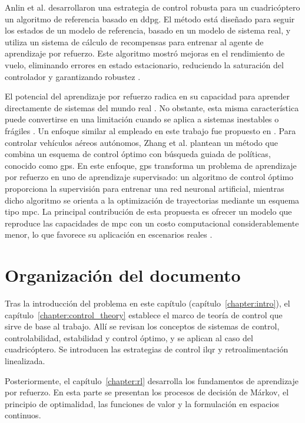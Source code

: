 Anlin et al. \cite{liu2022robust} desarrollaron una estrategia de control robusta para un cuadricóptero un algoritmo de referencia basado en \acrfull{ddpg}.  El método está diseñado para seguir los estados de un modelo de referencia, basado en un modelo de sistema real, y utiliza un sistema de cálculo de recompensas para entrenar al agente de aprendizaje por refuerzo. Este algoritmo mostró mejoras en el rendimiento de vuelo, eliminando errores en estado estacionario, reduciendo la saturación del controlador y garantizando robustez \cite{liu2022robust}.

El potencial del aprendizaje por refuerzo radica en su capacidad para aprender directamente de sistemas del mundo real \cite{zhang2016}. No obstante, esta misma característica puede convertirse en una limitación cuando se aplica a sistemas inestables o frágiles \cite{zhang2016}. Un enfoque similar al empleado en este trabajo fue propuesto en \cite{zhang2016}. Para controlar vehículos aéreos autónomos, Zhang et al. \cite{zhang2016} plantean un método que combina un esquema de control óptimo con búsqueda guiada de políticas, conocido como \acrfull{gps}. En este enfoque, \acrshort{gps} transforma un problema de aprendizaje por refuerzo en uno de aprendizaje supervisado: un algoritmo de control óptimo proporciona la supervisión para entrenar una red neuronal artificial, mientras dicho algoritmo se orienta a la optimización de trayectorias mediante un esquema tipo \acrshort{mpc}. La principal contribución de esta propuesta es ofrecer un modelo que reproduce las capacidades de \acrshort{mpc} con un costo computacional considerablemente menor, lo que favorece su aplicación en escenarios reales \cite{zhang2016}.

\section{Organización del documento}

Tras la introducción del problema en este capítulo (capítulo~\ref{chapter:intro}), el capítulo~\ref{chapter:control_theory} establece el marco de teoría de control que sirve de base al trabajo. Allí se revisan los conceptos de sistemas de control, controlabilidad, estabilidad y control óptimo, y se aplican al caso del cuadricóptero. Se introducen las estrategias de control \acrshort{ilqr} y retroalimentación linealizada.

Posteriormente, el capítulo~\ref{chapter:rl} desarrolla los fundamentos de aprendizaje por refuerzo. En esta parte se presentan los procesos de decisión de Márkov, el principio de optimalidad, las funciones de valor y la formulación en espacios continuos.

